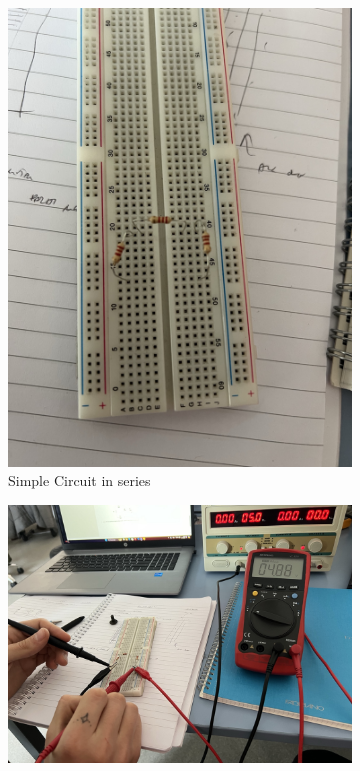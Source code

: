 \documentclass[a4paper, 10pt]{article}
\begin{document}
					\pagebreak
					\begin{figure}[h]
						\centering
							\begin{subfigure}[h]{0.25\textwidth}
								\includegraphics[width=\textwidth]{./images/SimpleCircuitInSeries.jpeg}
								\caption{Simple Circuit in series}
								\label{sub-fig:SimpleCircuitInSeries}
							\end{subfigure}
							\hspace{0.5cm} %
							\begin{subfigure}[h]{0.65\textwidth}
								\includegraphics[width=\textwidth]{./images/MeasuringVoltageOfACircuit.jpeg}

\end{subfigure}
\end{figure}
\end{document}
